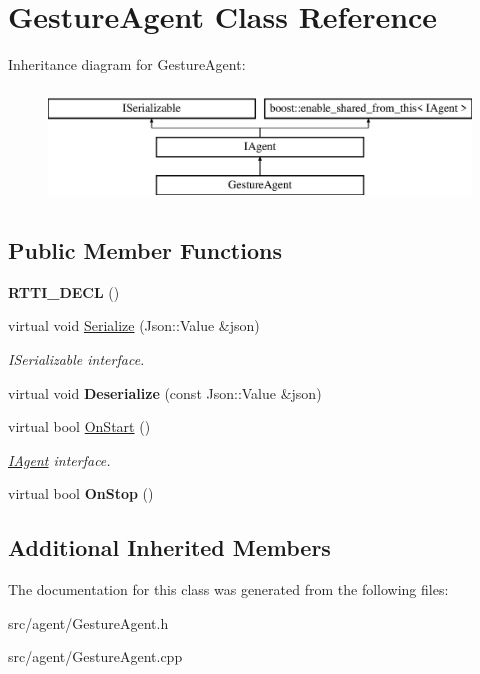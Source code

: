 \hypertarget{class_gesture_agent}{}\section{Gesture\+Agent Class Reference}
\label{class_gesture_agent}
Inheritance diagram for Gesture\+Agent\+:\begin{figure}[H]
\begin{center}
\leavevmode
\includegraphics[height=3.000000cm]{class_gesture_agent}
\end{center}
\end{figure}
\subsection*{Public Member Functions}
\begin{DoxyCompactItemize}
\item 
\mbox{\label{class_gesture_agent_a78fb03ce29164313330949299bb7cbc9}} 
{\bfseries R\+T\+T\+I\+\_\+\+D\+E\+CL} ()
\item 
\mbox{\label{class_gesture_agent_a1dabc7276f42e2574e68b22a6b0a785e}} 
virtual void \hyperlink{class_gesture_agent_a1dabc7276f42e2574e68b22a6b0a785e}{Serialize} (Json\+::\+Value \&json)
\begin{DoxyCompactList}\small\item\em I\+Serializable interface. \end{DoxyCompactList}\item 
\mbox{\label{class_gesture_agent_a8d9734b72a1c89e456c10870343abc3c}} 
virtual void {\bfseries Deserialize} (const Json\+::\+Value \&json)
\item 
\mbox{\label{class_gesture_agent_ac773ca370ebf0f93a149d0006f22e498}} 
virtual bool \hyperlink{class_gesture_agent_ac773ca370ebf0f93a149d0006f22e498}{On\+Start} ()
\begin{DoxyCompactList}\small\item\em \hyperlink{class_i_agent}{I\+Agent} interface. \end{DoxyCompactList}\item 
\mbox{\label{class_gesture_agent_aff07bd0cc5e93497f3315bb9119e2403}} 
virtual bool {\bfseries On\+Stop} ()
\end{DoxyCompactItemize}
\subsection*{Additional Inherited Members}


The documentation for this class was generated from the following files\+:\begin{DoxyCompactItemize}
\item 
src/agent/Gesture\+Agent.\+h\item 
src/agent/Gesture\+Agent.\+cpp\end{DoxyCompactItemize}
